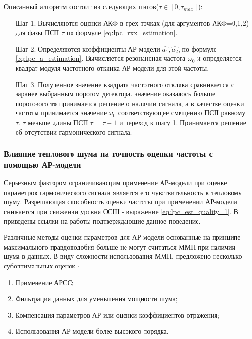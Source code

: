 Описанный алгоритм состоит из следующих шагов(${\tau \in [0, \tau_{max}]}$):
\begin{itemize}
\item[Шаг 1.] Вычисляются оценки АКФ в трех точках (для аргументов АКФ=0,1,2)
	для фазы ПСП ${\tau}$ по формуле \ref{eq:lpc_rxx_estimation}. 
\item[Шаг 2.] Определяются коэффициенты АР-модели ${\hat{a_1}, \hat{a_2}}$, 
	по формуле \ref{eq:lpc_a_estimation}. 
	Вычисляется резонансная частота ${\omega_0}$
	и определяется квадрат модуля частотного отклика АР-модели для этой частоты. 
\item[Шаг 3.] Полученное значение квадрата частотного отклика сравнивается с заранее выбранным порогом детектора. 
	  значение оказалось больше порогового {\bf{то}} 
		принимается решение о наличии сигнала, а в качестве оценки
		частоты принимается значение ${\omega_0}$ соответствующее смещению ПСП равному ${\tau}$. 
	 ${\tau}$ меньше длины ПСП ${\tau = \tau + 1}$ и переход к шагу 1.
		Принимается решение об отсутствии гармонического сигнала.
\end{itemize}

\subsubsection{Влияние теплового шума на точность оценки частоты с помощью АР-модели}
Серьезным фактором ограничивающим применение АР-модели при оценке параметров гармонического сигнала является
его чувствительность к тепловому шуму. Разрешающая способность оценки
частоты при применении АР-модели снижается при снижении уровня ОСШ - выражение \ref{eq:lpc_est_quality_1}.
В \cite{kay_ar_book} приведены ссылки на работы
\cite{lacoss_spectral_est, chen_spectral_est, marple_1977} подтверждающие данное поведение.

Различные методы оценки параметров для АР-модели основанные на принципе максимального правдоподобия больше не
могут считаться ММП при наличии шума в данных. В виду сложности использования ММП, предложено несколько 
субоптимальных оценок \cite{marpl_book, kay_ar_book}:
\begin{enumerate}
	\item Применение АРСС;
	\item Фильтрация данных для уменьшения мощности шума;
	\item Компенсация параметров АР или оценки коэффициентов отражения;
	\item Использования АР-модели более высокого порядка.
\end{enumerate}

